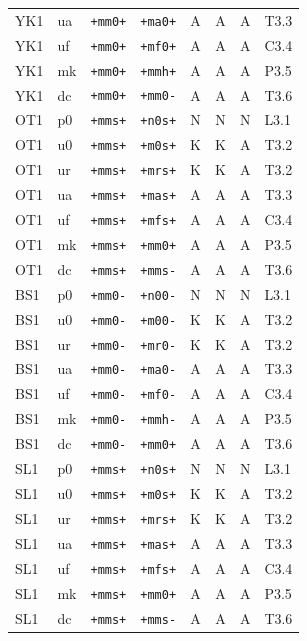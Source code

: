 {\begin{longtable}{@{}llllcccl@{}}
YK1 & ua & \texttt{+mm0+} & \texttt{+ma0+} & A & A & A & T3.3 \\
YK1 & uf & \texttt{+mm0+} & \texttt{+mf0+} & A & A & A & C3.4 \\
YK1 & mk & \texttt{+mm0+} & \texttt{+mmh+} & A & A & A & P3.5 \\
YK1 & dc & \texttt{+mm0+} & \texttt{+mm0-} & A & A & A & T3.6 \\
OT1 & p0 & \texttt{+mms+} & \texttt{+n0s+} & N & N & N & L3.1 \\
OT1 & u0 & \texttt{+mms+} & \texttt{+m0s+} & K & K & A & T3.2 \\
OT1 & ur & \texttt{+mms+} & \texttt{+mrs+} & K & K & A & T3.2 \\
OT1 & ua & \texttt{+mms+} & \texttt{+mas+} & A & A & A & T3.3 \\
OT1 & uf & \texttt{+mms+} & \texttt{+mfs+} & A & A & A & C3.4 \\
OT1 & mk & \texttt{+mms+} & \texttt{+mm0+} & A & A & A & P3.5 \\
OT1 & dc & \texttt{+mms+} & \texttt{+mms-} & A & A & A & T3.6 \\
BS1 & p0 & \texttt{+mm0-} & \texttt{+n00-} & N & N & N & L3.1 \\
BS1 & u0 & \texttt{+mm0-} & \texttt{+m00-} & K & K & A & T3.2 \\
BS1 & ur & \texttt{+mm0-} & \texttt{+mr0-} & K & K & A & T3.2 \\
BS1 & ua & \texttt{+mm0-} & \texttt{+ma0-} & A & A & A & T3.3 \\
BS1 & uf & \texttt{+mm0-} & \texttt{+mf0-} & A & A & A & C3.4 \\
BS1 & mk & \texttt{+mm0-} & \texttt{+mmh-} & A & A & A & P3.5 \\
BS1 & dc & \texttt{+mm0-} & \texttt{+mm0+} & A & A & A & T3.6 \\
SL1 & p0 & \texttt{+mms+} & \texttt{+n0s+} & N & N & N & L3.1 \\
SL1 & u0 & \texttt{+mms+} & \texttt{+m0s+} & K & K & A & T3.2 \\
SL1 & ur & \texttt{+mms+} & \texttt{+mrs+} & K & K & A & T3.2 \\
SL1 & ua & \texttt{+mms+} & \texttt{+mas+} & A & A & A & T3.3 \\
SL1 & uf & \texttt{+mms+} & \texttt{+mfs+} & A & A & A & C3.4 \\
SL1 & mk & \texttt{+mms+} & \texttt{+mm0+} & A & A & A & P3.5 \\
SL1 & dc & \texttt{+mms+} & \texttt{+mms-} & A & A & A & T3.6 \\

\end{longtable}}
